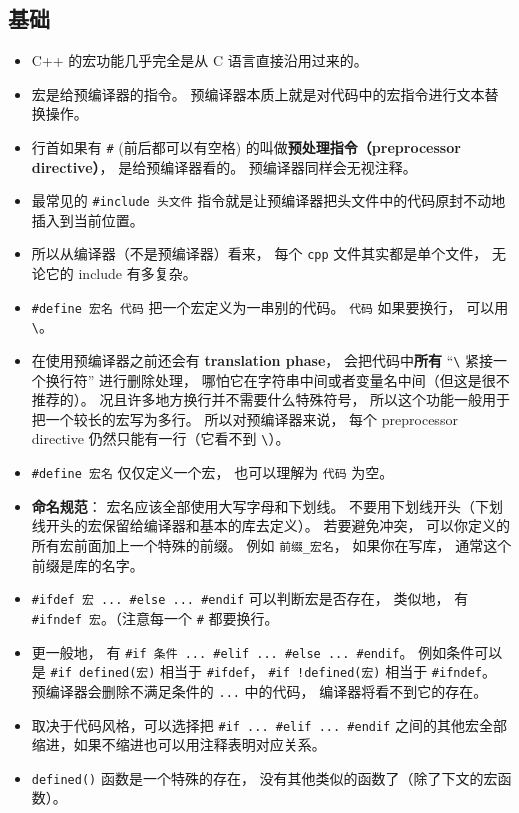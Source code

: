 
\subsection{基础}
\begin{itemize}
\item C++ 的宏功能几乎完全是从 C 语言直接沿用过来的。
\item 宏是给预编译器的指令。 预编译器本质上就是对代码中的宏指令进行文本替换操作。
\item 行首如果有 \verb`#` (前后都可以有空格) 的叫做\textbf{预处理指令（preprocessor directive）}， 是给预编译器看的。 预编译器同样会无视注释。
\item 最常见的 \verb`#include 头文件` 指令就是让预编译器把头文件中的代码原封不动地插入到当前位置。
\item 所以从编译器（不是预编译器）看来， 每个 \verb`cpp` 文件其实都是单个文件， 无论它的 include 有多复杂。
\item \verb`#define 宏名 代码` 把一个宏定义为一串别的代码。 \verb`代码` 如果要换行， 可以用 \verb`\`。
\item 在使用预编译器之前还会有 \textbf{translation phase}， 会把代码中\textbf{所有} “\verb`\` 紧接一个换行符” 进行删除处理， 哪怕它在字符串中间或者变量名中间（但这是很不推荐的）。 况且许多地方换行并不需要什么特殊符号， 所以这个功能一般用于把一个较长的宏写为多行。 所以对预编译器来说， 每个 preprocessor directive 仍然只能有一行（它看不到 \verb`\`）。
\item \verb`#define 宏名` 仅仅定义一个宏， 也可以理解为 \verb`代码` 为空。
\item \textbf{命名规范}： 宏名应该全部使用大写字母和下划线。 不要用下划线开头（下划线开头的宏保留给编译器和基本的库去定义）。 若要避免冲突， 可以你定义的所有宏前面加上一个特殊的前缀。 例如 \verb`前缀_宏名`， 如果你在写库， 通常这个前缀是库的名字。
\item \verb`#ifdef 宏 ... #else ... #endif` 可以判断宏是否存在， 类似地， 有 \verb`#ifndef 宏`。（注意每一个 \verb`#` 都要换行。
\item 更一般地， 有 \verb`#if 条件 ... #elif ... #else ... #endif`。 例如条件可以是 \verb`#if defined(宏)` 相当于 \verb`#ifdef`， \verb`#if !defined(宏)` 相当于 \verb`#ifndef`。 预编译器会删除不满足条件的 \verb`...` 中的代码， 编译器将看不到它的存在。
\item 取决于代码风格，可以选择把 \verb`#if ... #elif ... #endif` 之间的其他宏全部缩进，如果不缩进也可以用注释表明对应关系。
\item \verb`defined()` 函数是一个特殊的存在， 没有其他类似的函数了（除了下文的宏函数）。

\end{itemize}
